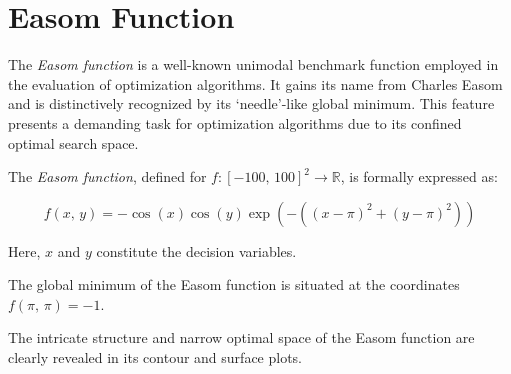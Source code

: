 \section{Easom Function}
\label{sec:app:test:easom}

  The \emph{Easom function} is a well-known unimodal benchmark function employed 
  in the evaluation of optimization algorithms.
  It gains its name from Charles Easom and is distinctively recognized by its 
  `needle'-like global minimum.
  This feature presents a demanding task for optimization algorithms due to its
  confined optimal search space.

  \begin{definition}
    \label{def:app:test:easom}
    The \emph{Easom function}, defined for \(f: [-100,\,100]^2 \rightarrow 
    \mathbb{R}\), is formally expressed as:

    \begin{equation}
      \label{eq:app:test:easom}
      f(x,\, y) = -\cos(x)\cos(y)\exp\left(-((x-\pi)^2+(y-\pi)^2)\right)
    \end{equation}
    
    Here, \(x\) and \(y\) constitute the decision variables.
  \end{definition}

  The global minimum of the Easom function is situated at the coordinates 
  \(f(\pi,\, \pi) = -1\).

  The intricate structure and narrow optimal space of the Easom function are
  clearly revealed in its contour and surface plots. 

